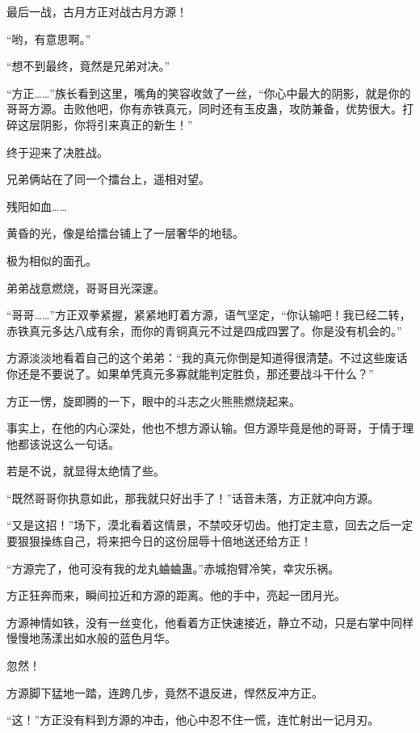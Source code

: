
\begin{this_body}



最后一战，古月方正对战古月方源！

“哟，有意思啊。”

“想不到最终，竟然是兄弟对决。”

“方正……”族长看到这里，嘴角的笑容收敛了一丝，“你心中最大的阴影，就是你的哥哥方源。击败他吧，你有赤铁真元，同时还有玉皮蛊，攻防兼备，优势很大。打碎这层阴影，你将引来真正的新生！”

终于迎来了决胜战。

兄弟俩站在了同一个擂台上，遥相对望。

残阳如血……

黄昏的光，像是给擂台铺上了一层奢华的地毯。

极为相似的面孔。

弟弟战意燃烧，哥哥目光深邃。

“哥哥……”方正双拳紧握，紧紧地盯着方源，语气坚定，“你认输吧！我已经二转，赤铁真元多达八成有余，而你的青铜真元不过是四成四罢了。你是没有机会的。”

方源淡淡地看着自己的这个弟弟：“我的真元你倒是知道得很清楚。不过这些废话你还是不要说了。如果单凭真元多寡就能判定胜负，那还要战斗干什么？”

方正一愣，旋即腾的一下，眼中的斗志之火熊熊燃烧起来。

事实上，在他的内心深处，他也不想方源认输。但方源毕竟是他的哥哥，于情于理他都该说这么一句话。

若是不说，就显得太绝情了些。

“既然哥哥你执意如此，那我就只好出手了！”话音未落，方正就冲向方源。

“又是这招！”场下，漠北看着这情景，不禁咬牙切齿。他打定主意，回去之后一定要狠狠操练自己，将来把今日的这份屈辱十倍地送还给方正！

“方源完了，他可没有我的龙丸蛐蛐蛊。”赤城抱臂冷笑，幸灾乐祸。

方正狂奔而来，瞬间拉近和方源的距离。他的手中，亮起一团月光。

方源神情如铁，没有一丝变化，他看着方正快速接近，静立不动，只是右掌中同样慢慢地荡漾出如水般的蓝色月华。

忽然！

方源脚下猛地一踏，连跨几步，竟然不退反进，悍然反冲方正。

“这！”方正没有料到方源的冲击，他心中忍不住一慌，连忙射出一记月刃。


\end{this_body}
